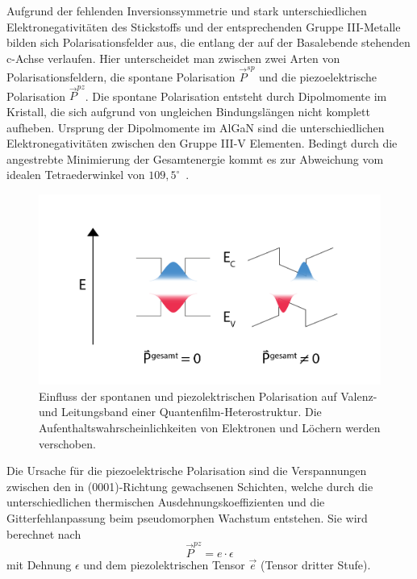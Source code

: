 Aufgrund der fehlenden Inversionssymmetrie und stark unterschiedlichen Elektronegativitäten des Stickstoffs und der entsprechenden Gruppe III-Metalle bilden sich Polarisationsfelder aus, die entlang der auf der Basalebende stehenden c-Achse verlaufen. Hier unterscheidet man zwischen zwei Arten von Polarisationsfeldern, die spontane Polarisation $ \vec{P}^{sp} $ und die piezoelektrische Polarisation $ \vec{P}^{pz} $. Die spontane Polarisation entsteht durch Dipolmomente im Kristall, die sich aufgrund von ungleichen Bindungslängen nicht komplett aufheben. Ursprung der 
Dipolmomente im AlGaN sind die unterschiedlichen Elektronegativitäten zwischen den Gruppe III-V Elementen. Bedingt durch die angestrebte Minimierung der Gesamtenergie kommt es zur Abweichung vom idealen Tetraederwinkel von $109,5^{\circ}$~\cite{ambacher2002}.
%
\begin{figure}[htb]
    \centering
    \begin{minipage}[t]{1.0\linewidth}
        \centering
        \includegraphics[width=0.7\linewidth]{Bilder/QCSE.png}
    \end{minipage}%
    \caption{Einfluss der spontanen und piezolektrischen Polarisation auf Valenz- und Leitungsband einer Quantenfilm-Heterostruktur. Die Aufenthaltswahrscheinlichkeiten von Elektronen und Löchern werden verschoben.}
        \label{fig:qcse}
\end{figure}
\noindent
Die Ursache für die piezoelektrische Polarisation sind die Verspannungen zwischen den in (0001)-Richtung gewachsenen Schichten, welche durch die unterschiedlichen thermischen Ausdehnungskoeffizienten und die Gitterfehlanpassung beim pseudomorphen Wachstum entstehen. Sie wird berechnet nach
%
\begin{equation}
    \vec{P}^{pz} = e \cdot \epsilon
\end{equation}
%
mit Dehnung $\epsilon$ und dem piezolektrischen Tensor $\vec{e}$ (Tensor dritter Stufe).
\newline
